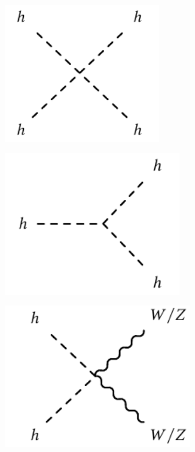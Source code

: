 \begin{figure}
	\centering
	\begin{subfigure}[b]{0.30\linewidth}
		\centering\includegraphics[width=0.75\textwidth]{h_boson_quartic_vertex}
	\end{subfigure}%
	\begin{subfigure}[b]{0.30\linewidth}
		\centering\includegraphics[width=0.85\textwidth]{h_boson_cubic_vertex}
	\end{subfigure}%
	\begin{subfigure}[b]{0.30\linewidth}
		\centering\includegraphics[width=0.9\textwidth]{h_boson_digauge_vertex}

\end{subfigure}
\end{figure}
